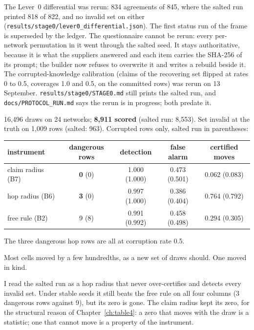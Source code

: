 The Lever~0 differential was rerun: 834 agreements of 845, where the salted run printed 818 of 822,
and no invalid set on either (\texttt{results/stage0/lever0\_differential.json}). The first status run
of the frame is superseded by the ledger. The questionnaire cannot be rerun: every per-network
permutation in it went through the salted seed. It stays authoritative, because it is what the
suppliers answered and each item carries the SHA-256 of its prompt; the builder now refuses to
overwrite it and writes a rebuild beside it. The corrupted-knowledge calibration (claims of the recovering set flipped at
rates 0 to 0.5, coverages 1.0 and 0.5, on the committed rows) was rerun on 13 September. \texttt{results/stage0/STAGE0.md} still prints the salted run, and
\texttt{docs/PROTOCOL\_RUN.md} says the rerun is in progress; both predate it.

\begin{medido}
16,496 draws on 24 networks; \textbf{8,911 scored} (salted run: 8,553). Set invalid at the truth on
1,009 rows (salted: 963). Corrupted rows only, salted run in parentheses:
\begin{center}
\small
\begin{tabular}{@{}lcccc@{}}
\toprule
instrument & dangerous rows & detection & false alarm & certified moves \\
\midrule
claim radius (B7) & \textbf{0} (0) & 1.000 (1.000) & 0.473 (0.501) & 0.062 (0.083) \\
hop radius (B6) & \textbf{3} (0) & 0.997 (1.000) & 0.386 (0.404) & 0.764 (0.792) \\
free rule (B2) & 9 (8) & 0.991 (0.992) & 0.458 (0.498) & 0.294 (0.305) \\
\bottomrule
\end{tabular}
\end{center}
The three dangerous hop rows are all at corruption rate 0.5.
\end{medido}

Most cells moved by a few hundredths, as a new set of draws should. One moved in kind.

\begin{armadilha}
I read the salted run as a hop radius that never over-certifies and detects every invalid set. Under
stable seeds it still beats the free rule on all four columns (3 dangerous rows against 9), but its zero
is gone. The claim radius kept its zero, for the structural reason of Chapter~\ref{ch:table4}: a zero
that moves with the draw is a statistic; one that cannot move is a property of the instrument.
\end{armadilha}

